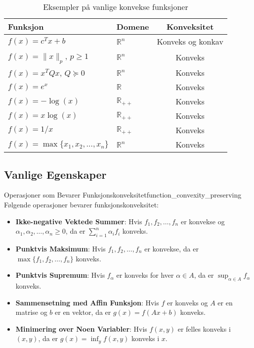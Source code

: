 \begin{table}[htb]
  \centering
  \begin{tabular}{|l|l|c|}
    \hline
    \textbf{Funksjon} & \textbf{Domene} & \textbf{Konveksitet} \\
    \hline
    $f(x) = c^Tx + b$ & $\mathbb{R}^n$ & Konveks og konkav \\
    $f(x) = \|x\|_p$, $p \geq 1$ & $\mathbb{R}^n$ & Konveks \\
    $f(x) = x^TQx$, $Q \succeq 0$ & $\mathbb{R}^n$ & Konveks \\
    $f(x) = e^x$ & $\mathbb{R}$ & Konveks \\
    $f(x) = -\log(x)$ & $\mathbb{R}_{++}$ & Konveks \\
    $f(x) = x\log(x)$ & $\mathbb{R}_{++}$ & Konveks \\
    $f(x) = 1/x$ & $\mathbb{R}_{++}$ & Konveks \\
    $f(x) = \max\{x_1, x_2, \ldots, x_n\}$ & $\mathbb{R}^n$ & Konveks \\
    \hline
  \end{tabular}
  \caption{Eksempler på vanlige konvekse funksjoner}
  \label{tab:convex_functions}
\end{table}

\subsection{Vanlige Egenskaper}
\begin{theorem}{Operasjoner som Bevarer Funksjonskonveksitet}{function_convexity_preserving}
  Følgende operasjoner bevarer funksjonskonveksitet:
  \begin{itemize}
    \item \textbf{Ikke-negative Vektede Summer}: Hvis $f_1, f_2, \ldots, f_n$ er konvekse og $\alpha_1, \alpha_2, \ldots, \alpha_n \geq 0$, da er $\sum_{i=1}^n \alpha_i f_i$ konveks.
    
    \item \textbf{Punktvis Maksimum}: Hvis $f_1, f_2, \ldots, f_n$ er konvekse, da er $\max\{f_1, f_2, \ldots, f_n\}$ konveks.
    
    \item \textbf{Punktvis Supremum}: Hvis $f_\alpha$ er konveks for hver $\alpha \in A$, da er $\sup_{\alpha \in A} f_\alpha$ konveks.
    
    \item \textbf{Sammensetning med Affin Funksjon}: Hvis $f$ er konveks og $A$ er en matrise og $b$ er en vektor, da er $g(x) = f(Ax + b)$ konveks.
    
    \item \textbf{Minimering over Noen Variabler}: Hvis $f(x,y)$ er felles konveks i $(x,y)$, da er $g(x) = \inf_y f(x,y)$ konveks i $x$.
  \end{itemize}
\end{theorem}

